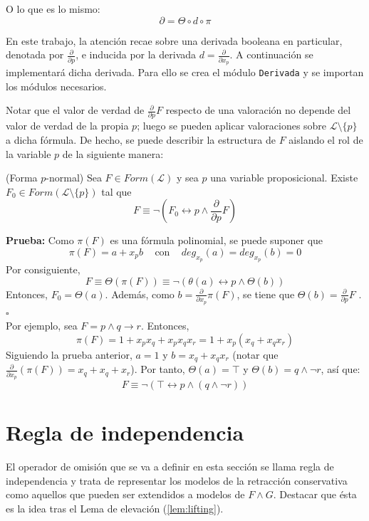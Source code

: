  \noindent O lo que es lo mismo: $$\partial = \Theta \circ d \circ \pi $$
 
 En este trabajo, la atención recae sobre una derivada booleana en particular, denotada por $\frac{\partial}{\partial p}$, e inducida por la derivada $d = \frac{\partial}{\partial x_p}$. A continuación se implementará dicha derivada. Para ello se crea el módulo \texttt{Derivada} y se importan los módulos necesarios.

  
Notar que el valor de verdad de $\frac{\partial}{\partial p}F$ respecto de una valoración no depende del valor de verdad de la propia $p$; luego se pueden aplicar valoraciones sobre $\mathcal{L} \setminus \{ p \}$ a dicha fórmula. De hecho, se puede describir la estructura de $F$ aislando el rol de la variable $p$ de la siguiente manera:

\newpage 

\lem \cite{Borrego2009} (Forma $p$-normal) Sea $F \in Form(\mathcal{L})$ y sea $p$ una variable proposicional. Existe $F_0 \in Form (\mathcal{L} \setminus \{ p \})$ tal que 
$$F \equiv \neg (F_0 \leftrightarrow p \wedge \frac{\partial}{\partial p} F)$$

\noindent \textbf{Prueba:} Como $\pi (F)$ es una fórmula polinomial, se puede suponer que
$$\pi (F) = a + x_p b \;\;\; \text{ con } \;\;\; deg_{x_p} (a) = deg_{x_p} (b) = 0$$
\noindent Por consiguiente,
$$F \equiv \Theta (\pi (F)) \equiv \neg (\theta (a) \leftrightarrow p \wedge \Theta (b)) $$
Entonces, $F_0 = \Theta (a)$. Además, como $b=\frac{\partial}{\partial x_p} \pi (F)$, se tiene que $\Theta (b) = \frac{\partial}{\partial p} F$ . \hspace{1cm} $\square$ \\

Por ejemplo, sea $F=p \wedge q \rightarrow r$. Entonces,
$$\pi (F) = 1+x_px_q + x_px_qx_r = 1+x_p (x_q+x_qx_r)$$
Siguiendo la prueba anterior, $a=1$ y $b=x_q+x_qx_r$ (notar que $\frac{\partial}{\partial x_p} (\pi (F))=x_q+x_q+x_r$). Por tanto, $\Theta (a) = \top$ y $\Theta (b)=q \wedge \neg r$, así que:
$$F \equiv \neg (\top \leftrightarrow p \wedge (q \wedge \neg r))$$

\newpage

\section{Regla de independencia}
El operador de omisión que se va a definir en esta sección se llama regla de independencia y trata de representar los modelos de la retracción conservativa como aquellos que pueden ser extendidos a modelos de $F \wedge G$. Destacar que ésta es la idea tras el Lema de elevación (\ref{lem:lifting}).\\

